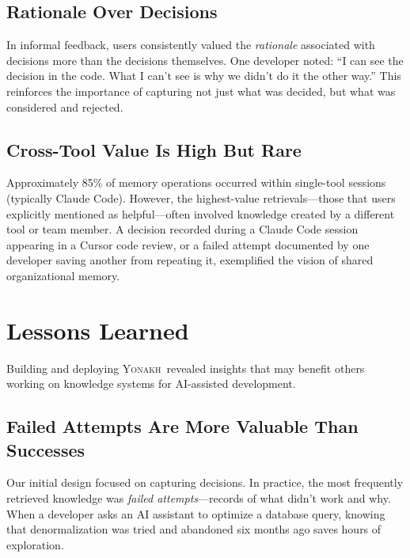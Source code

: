 \documentclass[10pt,journal,compsoc]{IEEEtran}
\newcommand{\yonakh}{\textsc{Yonakh}}
\begin{document}
\subsection{Rationale Over Decisions}

In informal feedback, users consistently valued the \emph{rationale} associated with decisions more than the decisions themselves. One developer noted: ``I can see the decision in the code. What I can't see is why we didn't do it the other way.'' This reinforces the importance of capturing not just what was decided, but what was considered and rejected.

\subsection{Cross-Tool Value Is High But Rare}

Approximately 85\% of memory operations occurred within single-tool sessions (typically Claude Code). However, the highest-value retrievals---those that users explicitly mentioned as helpful---often involved knowledge created by a different tool or team member. A decision recorded during a Claude Code session appearing in a Cursor code review, or a failed attempt documented by one developer saving another from repeating it, exemplified the vision of shared organizational memory.

\section{Lessons Learned}

Building and deploying \yonakh\ revealed insights that may benefit others working on knowledge systems for AI-assisted development.

\subsection{Failed Attempts Are More Valuable Than Successes}

Our initial design focused on capturing decisions. In practice, the most frequently retrieved knowledge was \emph{failed attempts}---records of what didn't work and why. When a developer asks an AI assistant to optimize a database query, knowing that denormalization was tried and abandoned six months ago saves hours of exploration.
\end{document}
